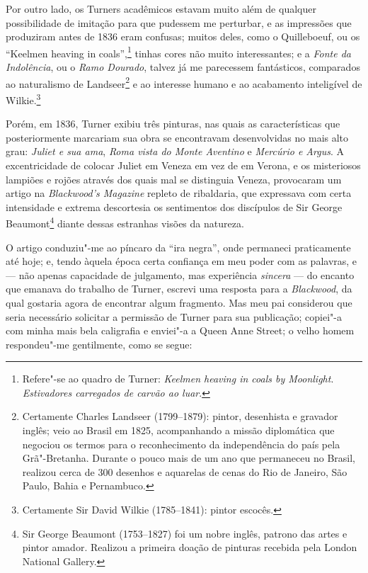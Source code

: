 Por outro lado, os Turners acadêmicos estavam muito além de qualquer
possibilidade de imitação para que pudessem me perturbar, e as
impressões que produziram antes de 1836 eram confusas; muitos deles,
como o Quilleboeuf, ou os ``Keelmen heaving in coals'',\footnote{Refere"-se
  ao quadro de Turner: \textit{Keelmen heaving in coals by Moonlight}.
  \textit{Estivadores carregados de carvão ao luar}.}
tinhas cores não muito interessantes; e a \textit{Fonte da Indolência}, ou
o \textit{Ramo Dourado}, talvez já me parecessem fantásticos, comparados
ao naturalismo de Landseer\footnote{Certamente Charles Landseer
  (1799--1879): pintor, desenhista e gravador inglês; veio ao Brasil em
  1825, acompanhando a missão diplomática que negociou os termos para o
  reconhecimento da independência do país pela Grã"-Bretanha. Durante o
  pouco mais de um ano que permaneceu no Brasil, realizou cerca de 300
  desenhos e aquarelas de cenas do Rio de Janeiro, São Paulo, Bahia e
  Pernambuco.} e ao interesse humano e ao acabamento
inteligível de Wilkie.\footnote{Certamente Sir David Wilkie (1785--1841):
  pintor escocês.}

Porém, em 1836, Turner exibiu três pinturas, nas quais as
características que posteriormente marcariam sua obra se encontravam
desenvolvidas no mais alto grau: \textit{Juliet e sua ama}, \textit{Roma
vista do Monte Aventino} e \textit{Mercúrio e Argus}. A excentricidade de
colocar Juliet em Veneza em vez de em Verona, e os misteriosos lampiões
e rojões através dos quais mal se distinguia Veneza, provocaram um
artigo na \textit{Blackwood's Magazine} repleto de ribaldaria, que
expressava com certa intensidade e extrema descortesia os sentimentos
dos discípulos de Sir George Beaumont\footnote{Sir George Beaumont
  (1753--1827) foi um nobre inglês, patrono das artes e pintor amador. Realizou
  a primeira doação de pinturas recebida pela London National Gallery.} diante dessas estranhas visões da natureza.

O artigo conduziu"-me ao píncaro da ``ira negra'', onde permaneci
praticamente até hoje; e, tendo àquela época certa confiança em meu
poder com as palavras, e --- não apenas capacidade de julgamento, mas
experiência \textit{sincera} --- do encanto que emanava do trabalho de
Turner, escrevi uma resposta para a \textit{Blackwood}, da qual gostaria
agora de encontrar algum fragmento. Mas meu pai considerou que seria
necessário solicitar a permissão de Turner para sua publicação; copiei"-a
com minha mais bela caligrafia e enviei"-a a Queen Anne Street; o velho
homem respondeu"-me gentilmente, como se segue: %

